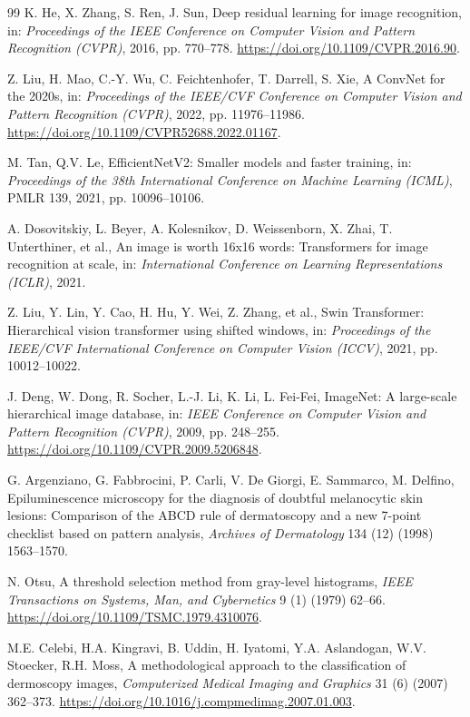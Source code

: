 \documentclass[11pt,a4paper]{article}
\begin{document}
\begin{thebibliography}{99}
K. He, X. Zhang, S. Ren, J. Sun, Deep residual learning for image recognition, in: \textit{Proceedings of the IEEE Conference on Computer Vision and Pattern Recognition (CVPR)}, 2016, pp. 770--778. \url{https://doi.org/10.1109/CVPR.2016.90}.

Z. Liu, H. Mao, C.-Y. Wu, C. Feichtenhofer, T. Darrell, S. Xie, A ConvNet for the 2020s, in: \textit{Proceedings of the IEEE/CVF Conference on Computer Vision and Pattern Recognition (CVPR)}, 2022, pp. 11976--11986. \url{https://doi.org/10.1109/CVPR52688.2022.01167}.

M. Tan, Q.V. Le, EfficientNetV2: Smaller models and faster training, in: \textit{Proceedings of the 38th International Conference on Machine Learning (ICML)}, PMLR 139, 2021, pp. 10096--10106.

A. Dosovitskiy, L. Beyer, A. Kolesnikov, D. Weissenborn, X. Zhai, T. Unterthiner, et al., An image is worth 16x16 words: Transformers for image recognition at scale, in: \textit{International Conference on Learning Representations (ICLR)}, 2021.

Z. Liu, Y. Lin, Y. Cao, H. Hu, Y. Wei, Z. Zhang, et al., Swin Transformer: Hierarchical vision transformer using shifted windows, in: \textit{Proceedings of the IEEE/CVF International Conference on Computer Vision (ICCV)}, 2021, pp. 10012--10022.

J. Deng, W. Dong, R. Socher, L.-J. Li, K. Li, L. Fei-Fei, ImageNet: A large-scale hierarchical image database, in: \textit{IEEE Conference on Computer Vision and Pattern Recognition (CVPR)}, 2009, pp. 248--255. \url{https://doi.org/10.1109/CVPR.2009.5206848}.

G. Argenziano, G. Fabbrocini, P. Carli, V. De Giorgi, E. Sammarco, M. Delfino, Epiluminescence microscopy for the diagnosis of doubtful melanocytic skin lesions: Comparison of the ABCD rule of dermatoscopy and a new 7-point checklist based on pattern analysis, \textit{Archives of Dermatology} 134 (12) (1998) 1563--1570.

N. Otsu, A threshold selection method from gray-level histograms, \textit{IEEE Transactions on Systems, Man, and Cybernetics} 9 (1) (1979) 62--66. \url{https://doi.org/10.1109/TSMC.1979.4310076}.

M.E. Celebi, H.A. Kingravi, B. Uddin, H. Iyatomi, Y.A. Aslandogan, W.V. Stoecker, R.H. Moss, A methodological approach to the classification of dermoscopy images, \textit{Computerized Medical Imaging and Graphics} 31 (6) (2007) 362--373. \url{https://doi.org/10.1016/j.compmedimag.2007.01.003}.


\end{thebibliography}
\end{document}
